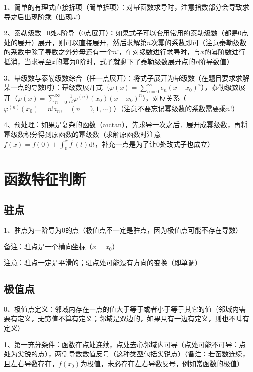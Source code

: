 1、简单的有理式直接拆项（简单拆项）：对幂函数求导时，注意指数部分会导致求导之后出现阶乘（出现$n!$）

2、泰勒级数+0处$n$阶导（0点展开）：如果式子可以套用常用的泰勒级数（都是0点处的展开）展开，则可以直接展开，然后求解第$n$次幂的系数即可（注意泰勒级数的系数中除了导数之外分母还有一个$n!$，在对级数进行求导时，与$x$的幂阶数进行抵消，当求导至$x$的幂为0阶时，式子就剩下了泰勒级数展开点的$n$阶导数值）

3、幂级数与泰勒级数综合（任一点展开）：将式子展开为幂级数（在题目要求求解某一点的导数时）：幂级数展开式（$\varphi(x)=\sum_{n=0}^{\infty} a_{n}\left(x-x_{0}\right)^{n}$），泰勒级数展开（$\varphi(x)=\sum_{n=0}^{\infty} \frac{1}{n !} \varphi^{(n)}\left(x_{0}\right)\left(x-x_{0}\right)^{n}$），对应关系（$\varphi^{(n)}\left(x_{0}\right)=n ! a_{n}, \quad(n=0,1, \cdots)$）（注意不要忘记幂级数的系数需要乘$n!$）

4、预处理：如果是复杂的函数（arctan），先求导一次之后，展开成幂级数，再将幂级数积分得到原函数的幂级数（求解原函数时注意$f(x)=f(0)+\int_{0}^{x} f^{\prime}(t) \mathrm{d} t$，补充一点是为了让0处改式子也成立）

\section{函数特征判断}



\subsection{驻点}

1、驻点为一阶导为0的点（极值点不一定是驻点，因为极值点可能不存在导数）

备注：驻点是一个横向坐标（$x=x_0$）

注意：驻点一定是平滑的；驻点处可能没有方向的变换（即单调）



\subsection{极值点}

0、极值点定义：邻域内存在一点的值大于等于或者小于等于其它的值（邻域内需要有定义，无穷值不算有定义；邻域是双边的，如果只有一边有定义，则也不叫有定义）

1、第一充分条件：函数在点处连续，点处去心邻域内可导（点处可能不可导：点处为尖锐的点），两侧导数数值反号（这种类型包括尖锐点）（备注：若函数连续，且左右导数存在，$f(x_0)$为极值，未必存在左右导数反号，例如常函数的极值）

